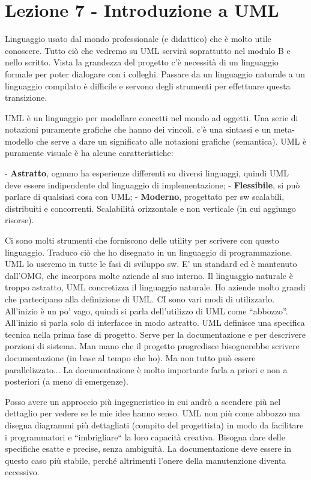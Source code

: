 



\section{Lezione 7 - Introduzione a UML}

Linguaggio usato dal mondo professionale (e didattico) che è molto utile conoscere. Tutto ciò che vedremo su UML servirà soprattutto nel modulo B e nello scritto. Vista la grandezza del progetto c'è necessità di un linguaggio formale per poter dialogare con i colleghi. Passare da un linguaggio naturale a un linguaggio compilato è difficile e servono degli strumenti per effettuare questa transizione. 

UML è un linguaggio per modellare concetti nel mondo ad oggetti. Una serie di notazioni puramente grafiche che hanno dei vincoli, c'è una sintassi e un meta-modello che serve a dare un significato alle notazioni grafiche (semantica). UML è puramente visuale è ha alcune caratteristiche:

- \textbf{Astratto}, ognuno ha esperienze differenti su diversi linguaggi, quindi UML deve essere indipendente dal linguaggio di implementazione;
- \textbf{Flessibile}, si può parlare di qualsiasi cosa con UML;
- \textbf{Moderno}, progettato per sw scalabili, distribuiti e concorrenti. Scalabilità orizzontale e non verticale (in cui aggiungo risorse).

Ci sono molti strumenti che forniscono delle utility per scrivere con questo linguaggio. Traduco ciò che ho disegnato in un linguaggio di programmazione. UML lo useremo in tutte le fasi di sviluppo sw. E' un standard ed è mantenuto dall'OMG, che incorpora molte aziende al suo interno. Il linguaggio naturale è troppo astratto, UML concretizza il linguaggio naturale. Ho aziende molto grandi che partecipano alla definizione di UML. CI sono vari modi di utilizzarlo. All'inizio è un po' vago, quindi si parla dell'utilizzo di UML come “abbozzo”. All'inizio si parla solo di interfacce in modo astratto. UML definisce una specifica tecnica nella prima fase di progetto. Serve per la documentazione e per descrivere porzioni di sistema. Man mano che il progetto progredisce bisognerebbe scrivere documentazione (in base al tempo che ho). Ma non tutto può essere parallelizzato... La documentazione è molto importante farla a priori e non a posteriori (a meno di emergenze).

Posso avere un approccio più ingegneristico in cui andrò a scendere più nel dettaglio per vedere se le mie idee hanno senso. UML non più come abbozzo ma disegna diagrammi più dettagliati (compito del progettista) in modo da facilitare i programmatori e “imbrigliare“ la loro capacità creativa. Bisogna dare delle specifiche esatte e precise, senza ambiguità. La documentazione deve essere in questo caso più stabile, perché altrimenti l'onere della manutenzione diventa eccessivo.

